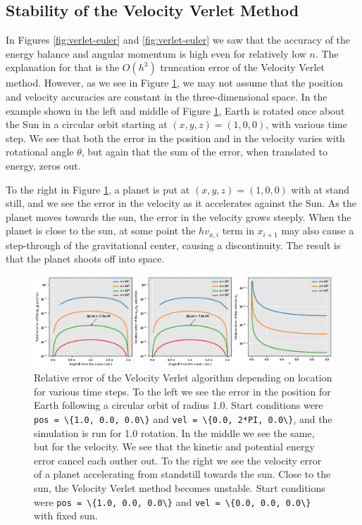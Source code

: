 \documentclass[]{article}
\begin{document}
\subsection{Stability of the Velocity Verlet Method}
In Figures \ref{fig:verlet-euler} and \ref{fig:verlet-euler} we saw that the accuracy of the energy balance and angular momentum is high even for relatively low $n$. The explanation for that is the $O(h^3)$ truncation error of the Velocity Verlet method. However, as we see in Figure \ref{fig:error}, we may not assume that the position and velocity accuracies are constant in the three-dimensional space. In the example shown in the left and middle of Figure \ref{fig:error}, Earth is rotated once about the Sun in a circular orbit starting at $(x,y,z)=(1,0,0)$, with various time step. We see that both the error in the position and in the velocity varies with rotational angle $\theta$, but again that the sum of the error, when translated to energy, zeros out.

To the right in Figure \ref{fig:error}, a planet is put at $(x,y,z)=(1,0,0)$ with at stand still, and we see the error in the velocity as it accelerates against the Sun. As the planet moves towards the sun, the error in the velocity grows steeply. When the planet is close to the sun, at some point the $hv_{x,i}$ term in $x_{i+1}$ may also cause a step-through of the gravitational center, causing a discontinuity. The result is that the planet shoots off into space.

\begin{figure}[!htb]
	\centering
	\includegraphics[width=1\linewidth]{error.png}
	\caption{Relative error of the Velocity Verlet algorithm depending on location for various time steps. To the left we see the error in the position for Earth following a circular orbit of radius 1.0. Start conditions were \lstinline|pos = \{1.0, 0.0, 0.0\}| and \lstinline|vel = \{0.0, 2*PI, 0.0\}|, and the simulation is run for 1.0 rotation. In the middle we see the same, but for the velocity. We see that the kinetic and potential energy error cancel each outher out. To the right we see the velocity error of a planet accelerating from standstill towards the sun. Close to the sun, the Velocity Verlet method becomes unstable. Start conditions were \lstinline|pos = \{1.0, 0.0, 0.0\}| and \lstinline|vel = \{0.0, 0.0, 0.0\}| with fixed sun.}
	\label{fig:error}
\end{figure}
\end{document}
